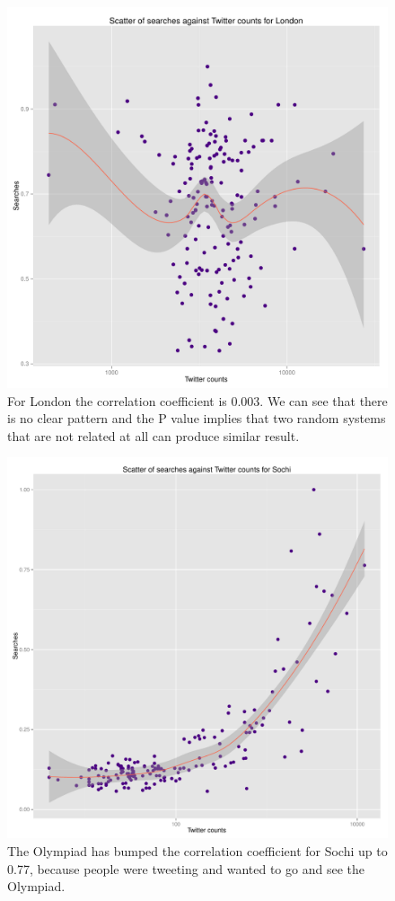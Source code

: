 \documentclass[minf,twoside,singlespacing,parskip,frontabs,notimes,11pt]{infthesis}
\begin{document}
\begin{figure}[]
\includegraphics[scale=0.65]{London} 
 \caption{For London the correlation coefficient is 0.003. We can see that there is no clear pattern and the P value implies that two random systems that are not related at all can produce similar result.}
\end{figure}

\begin{figure}[]
\includegraphics[scale=0.6]{Sochi}
\caption{The Olympiad has bumped the correlation coefficient for Sochi up to 0.77, because people were tweeting and wanted to go and see the Olympiad. }
\end{figure}
\end{document}
